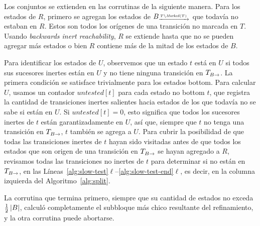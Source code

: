 Los conjuntos se extienden en las corrutinas de la siguiente manera.
Para los estados de $R$, primero se agregan los estados de $B_{\pijl{T \setminus \Marked(T)}}$ que todavía no estaban en $R$.
Estos son todos los orígenes de una transición no marcada en $T$.
Usando \textit{backwards inert reachability},
$R$ se extiende hasta que no se pueden agregar más estados o bien $R$ contiene más de la mitad de los estados de $B$.

Para identificar los estados de $U$, observemos que un estado $t$ está en $U$
si todos sus sucesores inertes están en $U$
y no tiene ninguna transición en $\TB$.
La primera condición se satisface trivialmente para los estados bottom.
Para calcular $U$, usamos un contador $\mathit{untested}[t]$ para cada estado no bottom $t$, que registra la cantidad de transiciones inertes salientes hacia estados de los que todavía no se sabe si están en $U$.
Si $\mathit{untested}[t] = 0$, esto significa que todos los sucesores inertes de $t$ están garantizadamente en $U$, así que, siempre que $t$ no
tenga una transición en $\TB$, $t$ también se agrega a $U$.
Para cubrir la posibilidad de que todas las transiciones inertes de $t$ hayan sido visitadas antes de que todos los estados que son origen de una transición en
$\TB$ se hayan agregado a $R$, revisamos todas las transiciones no inertes de $t$ para determinar
si no están en $\TB$, en las Líneas~\ref{alg:slow-test}$\ell$--\ref{alg:slow-test-end}$\ell$, es decir, en la columna izquierda del Algoritmo~\ref{alg:split}.

La corrutina que termina primero,
siempre que su cantidad de estados no exceda $\frac{1}{2}\left\lvert B \right\rvert$,
calculó completamente el subbloque más chico resultante del refinamiento,
y la otra corrutina puede abortarse.

